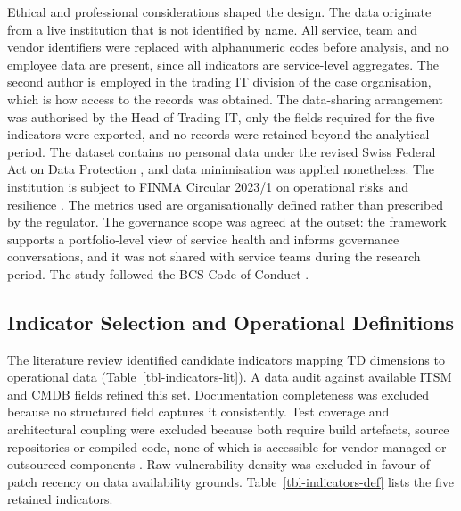\documentclass[
  journal,
]{IEEEtran}%
\begin{document}
Ethical and professional considerations shaped the design. The data
originate from a live institution that is not identified by name. All
service, team and vendor identifiers were replaced with alphanumeric
codes before analysis, and no employee data are present, since all
indicators are service-level aggregates. The second author is employed
in the trading IT division of the case organisation, which is how access
to the records was obtained. The data-sharing arrangement was authorised
by the Head of Trading IT, only the fields required for the five
indicators were exported, and no records were retained beyond the
analytical period. The dataset contains no personal data under the
revised Swiss Federal Act on Data Protection
, and data minimisation was
applied nonetheless. The institution is subject to FINMA Circular 2023/1
on operational risks and resilience
. The metrics used are
organisationally defined rather than prescribed by the regulator. The
governance scope was agreed at the outset: the framework supports a
portfolio-level view of service health and informs governance
conversations, and it was not shared with service teams during the
research period. The study followed the BCS Code of Conduct
.

\subsection{Indicator Selection and Operational
Definitions}\label{sec-indicators}

The literature review identified candidate indicators mapping TD
dimensions to operational data (Table~\ref{tbl-indicators-lit}). A data
audit against available ITSM and CMDB fields refined this set.
Documentation completeness was excluded because no structured field
captures it consistently. Test coverage and architectural coupling were
excluded because both require build artefacts, source repositories or
compiled code, none of which is accessible for vendor-managed or
outsourced components
. Raw
vulnerability density was excluded in favour of patch recency on data
availability grounds. Table~\ref{tbl-indicators-def} lists the five
retained indicators.
\end{document}
